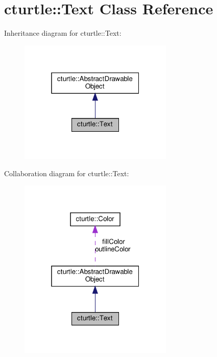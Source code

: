 \hypertarget{classcturtle_1_1Text}{}\section{cturtle\+:\+:Text Class Reference}
\label{classcturtle_1_1Text}


Inheritance diagram for cturtle\+:\+:Text\+:\nopagebreak
\begin{figure}[H]
\begin{center}
\leavevmode
\includegraphics[width=208pt]{classcturtle_1_1Text__inherit__graph}
\end{center}
\end{figure}


Collaboration diagram for cturtle\+:\+:Text\+:\nopagebreak
\begin{figure}[H]
\begin{center}
\leavevmode
\includegraphics[width=208pt]{classcturtle_1_1Text__coll__graph}
\end{center}
\end{figure}
